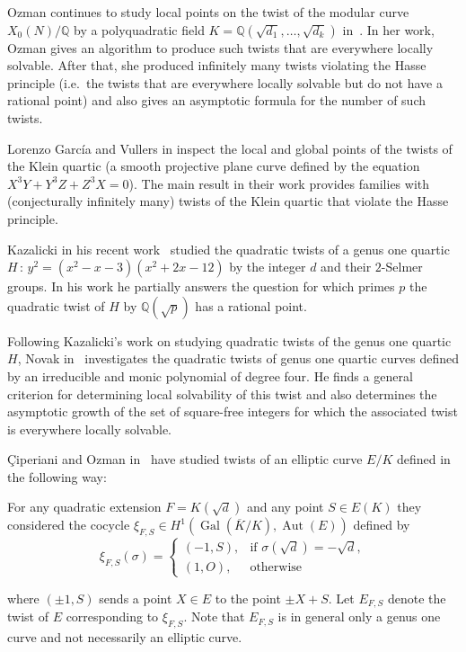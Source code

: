 \documentclass[a4paper, 12pt]{amsart}
\theoremstyle{definition}
\theoremstyle{remark}
\newcommand{\GalK}{\operatorname{Gal}(\overline{K}/K)}
\newcommand{\whichbold}[1]{\mathbb{#1}} %
\newcommand{\Q}{\whichbold{Q}}
\numberwithin{equation}{section}
\begin{document}
 Ozman continues to study local points on the twist of the modular curve $X_0(N)/\Q$ by a polyquadratic field $K=\Q(\sqrt{d_1},\dotso, \sqrt{d_k})$ in~\cite{MR3071815}. In her work, Ozman gives an algorithm to produce such twists that are everywhere locally solvable. After that, she produced infinitely many twists violating the Hasse principle (i.e.\ the twists that are everywhere locally solvable but do not have a rational point) and also gives an asymptotic formula for the number of such twists.

 Lorenzo Garc\'ia and  Vullers in\cite{MR4770972} inspect the local and global points of the twists of the Klein quartic (a smooth projective plane curve defined by the equation $X^3Y+Y^3Z+Z^3X=0$). The main result in their work provides families with (conjecturally infinitely many) twists of the Klein quartic that violate the Hasse principle.

Kazalicki in his recent work~\cite{MR4935708} studied the quadratic twists of a genus one quartic $H\,:\, y^2=(x^2-x-3)(x^2+2x-12)$ by the integer $d$ and their $2$-Selmer groups. In his work he partially answers the question for which primes $p$ the quadratic twist of $H$ by $\Q(\sqrt{p})$ has a rational point.

Following Kazalicki's work on studying quadratic twists of the genus one quartic $H$, Novak in~\cite{MR4902719} investigates the quadratic twists of genus one quartic curves defined by an irreducible and monic polynomial of degree four. He finds a general criterion for determining local solvability of this twist and also determines the asymptotic growth of the set of square-free integers for which the associated twist is everywhere locally solvable.

Çiperiani and Ozman in~\cite{ciperiani2015local} have studied twists of an elliptic curve $E/K$ defined in the following way:

For any quadratic extension $F=K(\sqrt{d})$ and any point $S\in E(K)$ they considered the cocycle $\xi_{F,S} \in H^1\left(\GalK, \operatorname{Aut}(E)\right)$ defined by
        \[
            \xi_{F,S} (\sigma)=
            \begin{cases}
                (-1,S), & \text{if } \sigma(\sqrt{d})=-\sqrt{d}, \\
                (1,O), & \text{otherwise } 
            \end{cases}
        \]

where $(\pm 1,S)$ sends a point $X \in E$ to the point $\pm X+S$.
Let $E_{F,S}$ denote the twist of $E$ corresponding to $\xi_{F,S}$. Note that $E_{F,S}$ is in general only a genus one curve and not necessarily an elliptic curve. 
\end{document}
